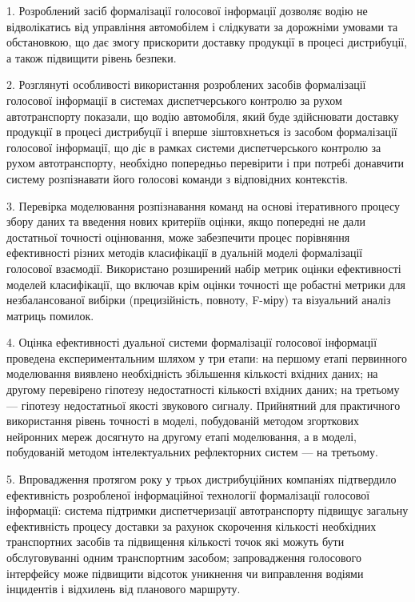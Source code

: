 1. Розроблений засіб формалізації голосової інформації дозволяє водію не відволікатись від управління автомобілем і слідкувати за дорожніми умовами та обстановкою, що дає змогу прискорити доставку продукції в процесі дистрибуції, а також підвищити рівень безпеки.

2. Розглянуті особливості використання розроблених засобів формалізації голосової інформації в системах диспетчерського контролю за рухом автотранспорту показали, що водію автомобіля, який буде здійснювати доставку продукції в процесі дистрибуції і вперше зіштовхнеться із засобом формалізації голосової інформації, що діє в рамках системи диспетчерського контролю за рухом автотранспорту, необхідно попередньо перевірити і при потребі донавчити систему розпізнавати його голосові команди з відповідних контекстів.

3. Перевірка моделювання розпізнавання команд на основі ітеративного процесу збору даних та введення нових критеріїв оцінки, якщо попередні не дали достатньої точності оцінювання, може забезпечити процес порівняння ефективності різних методів класифікації в дуальній моделі формалізації голосової взаємодії.
Використано розширений набір метрик оцінки ефективності моделей класифікації, що включав крім оцінки точності ще робастні метрики для незбалансованої вибірки (прецизійність, повноту, F-міру) та візуальний аналіз матриць помилок.

4. Оцінка ефективності дуальної системи формалізації голосової інформації проведена експериментальним шляхом у три етапи: на першому етапі первинного моделювання виявлено необхідність збільшення кількості вхідних даних; на другому перевірено гіпотезу недостатності кількості вхідних даних; на третьому --- гіпотезу недостатньої якості звукового сигналу. Прийнятний для практичного використання рівень точності в моделі, побудованій методом згорткових нейронних мереж досягнуто на другому етапі моделювання, а в моделі, побудованій методом інтелектуальних рефлекторних систем --- на третьому.

5. Впровадження протягом року у трьох дистрибуційних компаніях підтвердило ефективність розробленої інформаційної технології формалізації голосової інформації: система підтримки диспетчеризації автотранспорту підвищує загальну ефективність процесу доставки за рахунок скорочення кількості необхідних транспортних засобів та підвищення кількості точок які можуть бути обслуговуванні одним транспортним засобом; запровадження голосового інтерфейсу може підвищити відсоток уникнення чи виправлення водіями інцидентів і відхилень від планового маршруту.

